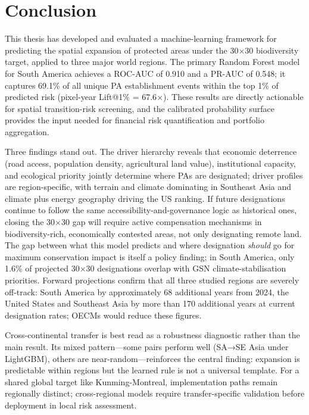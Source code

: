 \documentclass[12pt]{article}
\theoremstyle{break}
\begin{document}
\section{Conclusion}
\label{sec:conclusion}

This thesis has developed and evaluated a machine-learning framework for predicting
the spatial expansion of protected areas under the 30$\times$30 biodiversity target,
applied to three major world regions. The primary Random Forest model for South
America achieves a ROC-AUC of 0.910 and a PR-AUC of 0.548; it captures 69.1\% of
all unique PA establishment events within the top 1\% of predicted risk
(pixel-year Lift@1\% = 67.6$\times$). These results are directly actionable for
spatial transition-risk screening, and the calibrated probability surface provides
the input needed for financial risk quantification and portfolio aggregation.

Three findings stand out. The driver hierarchy reveals
that economic deterrence (road access, population density, agricultural land value), 
institutional capacity, and ecological priority jointly determine where
PAs are designated; driver profiles are region-specific, with terrain and climate
dominating in Southeast Asia and climate plus energy geography driving the US ranking.
If future designations continue to follow the same accessibility-and-governance logic
as historical ones, closing the 30$\times$30 gap will require active compensation
mechanisms in biodiversity-rich, economically contested areas, not only designating
remote land. The gap between what this model predicts and where designation
\emph{should} go for maximum conservation impact is itself a policy finding; in
South America, only 1.6\% of projected 30$\times$30 designations overlap with GSN
climate-stabilisation priorities. Forward projections confirm that all three studied regions are severely off-track:
South America by approximately 68 additional years from 2024, the United States and
Southeast Asia by more than 170 additional years at current designation rates;
OECMs would reduce these figures.

Cross-continental transfer is best read as a robustness diagnostic rather than the
main result. Its mixed pattern—some pairs perform well (SA→SE Asia under LightGBM),
others are near-random—reinforces the central finding: expansion is predictable
within regions but the learned rule is not a universal template. For a shared global
target like Kunming-Montreal, implementation paths remain regionally distinct;
cross-regional models require transfer-specific validation before deployment in
local risk assessment.
\end{document}
